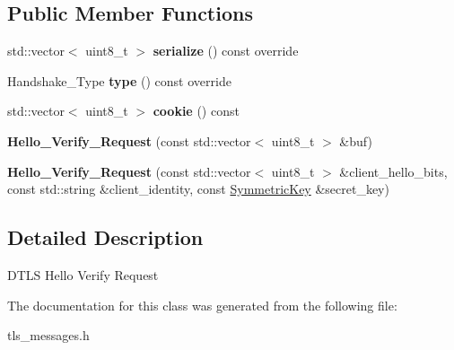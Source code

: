 \subsection*{Public Member Functions}
\begin{DoxyCompactItemize}
\item 
\mbox{\label{class_botan_1_1_t_l_s_1_1_hello___verify___request_acbf7d13557f3ee63ea3c7bacde0916b3}} 
std\+::vector$<$ uint8\+\_\+t $>$ {\bfseries serialize} () const override
\item 
\mbox{\label{class_botan_1_1_t_l_s_1_1_hello___verify___request_a57ebc435e1b6d9bacf358bb31d9ba051}} 
Handshake\+\_\+\+Type {\bfseries type} () const override
\item 
\mbox{\label{class_botan_1_1_t_l_s_1_1_hello___verify___request_a6caec5aa8a4aef5a8540a8918b444457}} 
std\+::vector$<$ uint8\+\_\+t $>$ {\bfseries cookie} () const
\item 
\mbox{\label{class_botan_1_1_t_l_s_1_1_hello___verify___request_a6804bcf547fd9de1a96f4dabbddccfde}} 
{\bfseries Hello\+\_\+\+Verify\+\_\+\+Request} (const std\+::vector$<$ uint8\+\_\+t $>$ \&buf)
\item 
\mbox{\label{class_botan_1_1_t_l_s_1_1_hello___verify___request_ae8feacf514c52b5868ef0696e03fb70a}} 
{\bfseries Hello\+\_\+\+Verify\+\_\+\+Request} (const std\+::vector$<$ uint8\+\_\+t $>$ \&client\+\_\+hello\+\_\+bits, const std\+::string \&client\+\_\+identity, const \hyperlink{namespace_botan_a89cf6c3513428f524454d01830221a88}{Symmetric\+Key} \&secret\+\_\+key)
\end{DoxyCompactItemize}


\subsection{Detailed Description}
D\+T\+LS Hello Verify Request 

The documentation for this class was generated from the following file\+:\begin{DoxyCompactItemize}
\item 
tls\+\_\+messages.\+h\end{DoxyCompactItemize}
